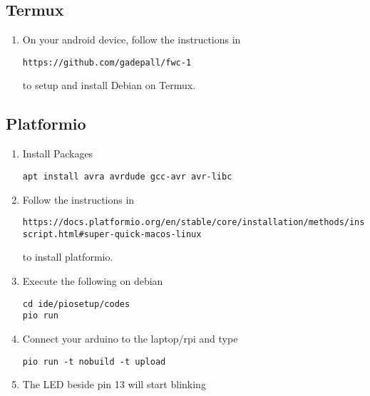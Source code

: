 \subsection{Termux}
\begin{enumerate}[label=\arabic*.,ref=\theenumi]
	\item On your android device, follow the instructions in 
%
\begin{lstlisting}
https://github.com/gadepall/fwc-1
\end{lstlisting}
to setup and install Debian on Termux.
\iffalse
\item Install Termux from apkpure
\item Install basic packages on termux 
\begin{lstlisting}
#Give termux access to your  user directory in android
termux-setup-storage

#Upgrade packages
apt update && apt upgrade
apt install build-essential openssh

#Mandatory packages
apt install curl git wget subversion proot proot-distro python  nmap neovim ranger
#------------------End Install Termux----------------------------
\end{lstlisting}
\item Install debian on termux 
\begin{lstlisting}
proot-distro install debian
proot-distro login debian
\end{lstlisting}
\fi
\end{enumerate}
\subsection{Platformio }
\begin{enumerate}[label=\arabic*.,ref=\theenumi]
	\item Install Packages
\begin{lstlisting}
apt install avra avrdude gcc-avr avr-libc
\end{lstlisting}
\item Follow the instructions in 
\begin{lstlisting}
https://docs.platformio.org/en/stable/core/installation/methods/installer-script.html#super-quick-macos-linux
\end{lstlisting}
to install platformio.
\item Execute the following on debian
\begin{lstlisting}
cd ide/piosetup/codes
pio run
\end{lstlisting}
\item Connect your arduino to the  laptop/rpi and type
\begin{lstlisting}
pio run -t nobuild -t upload
\end{lstlisting}
\item The LED beside pin 13 will start
blinking

\end{enumerate}
